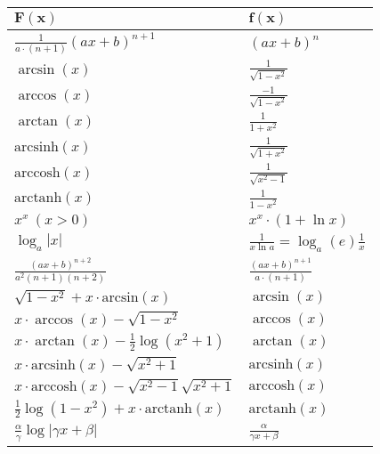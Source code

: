 \begin{center}
  \begin{tabularx}{\linewidth}{>{\centering\arraybackslash}X>{\centering\arraybackslash}X}
    \toprule
    $\mathbf{F(x)}$                                     & $\mathbf{f(x)}$                          \\
    \midrule
    $\frac{1}{a\cdot (n+1)}(ax+b)^{n+1}$                & $(ax+b)^n$                               \\

    $\arcsin(x)$                                        & $\frac{1}{\sqrt{1 - x^2}}$               \\
    $\arccos(x)$                                        & $\frac{-1}{\sqrt{1 - x^2}}$              \\
    $\arctan(x)$                                        & $\frac{1}{1 + x^2}$                      \\
    $\text{arcsinh}(x)$                                 & $\frac{1}{\sqrt{1 + x^2}}$               \\
    $\text{arccosh}(x) $                                & $\frac{1}{\sqrt{x^2 - 1}}$               \\
    $\text{arctanh}(x) $                                & $\frac{1}{1 - x^2}$                      \\
    $x^x \ (x > 0)$                                     & $x^x \cdot (1 + \ln x)$                  \\
    $\log_a|x|$                                         & $\frac{1}{x \ln a}=\log_a(e)\frac{1}{x}$ \\
    $\frac{(ax+b)^{n+2}}{a^2(n+1)(n+2)}$                & $\frac{(ax+b)^{n+1}}{a\cdot (n+1)}$      \\
    $\sqrt{1-x^2}+x\cdot \text{arcsin}(x)$              & $\arcsin(x)$                             \\
    $x\cdot \arccos(x)-\sqrt{1-x^2}$                    & $\arccos(x)$                             \\
    $x\cdot \arctan(x)-\frac{1}{2} \log(x^2+1)$         & $\arctan(x)$                             \\
    $x\cdot \text{arcsinh}(x)-\sqrt{x^2+1}$             & $\text{arcsinh}(x)$                      \\
    $x\cdot \text{arccosh}(x)-\sqrt{x^2-1}\sqrt{x^2+1}$ & $\text{arccosh}(x)$                      \\
    $\frac{1}{2} \log(1-x^2)+x\cdot \text{arctanh}(x)$  & $\text{arctanh}(x)$                      \\
    $\frac{\alpha}{\gamma}\log|\gamma x+\beta|$         & $\frac{\alpha}{\gamma x+\beta}$          \\
    \bottomrule
  \end{tabularx}
\end{center}

